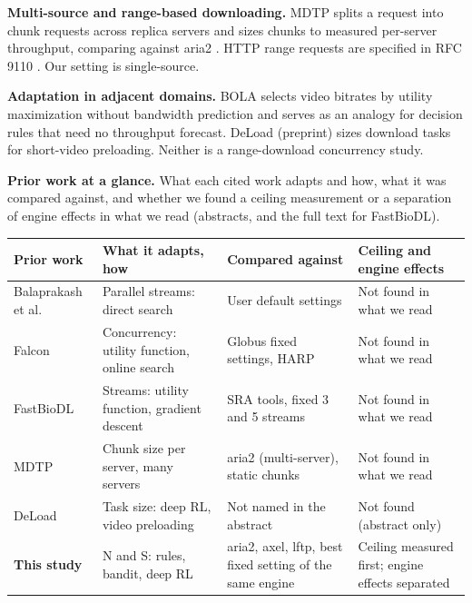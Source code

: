 \documentclass[conference]{IEEEtran}
\begin{document}
\textbf{Multi-source and range-based downloading.} MDTP \cite{abdollah2025mdtp} splits a request into chunk requests across replica servers and sizes chunks to measured per-server throughput, comparing against aria2 \cite{aria2manual}. HTTP range requests are specified in RFC 9110 \cite{rfc9110}. Our setting is single-source.


\textbf{Adaptation in adjacent domains.} BOLA \cite{spiteri2016bola,spiteri2020bola} selects video bitrates by utility maximization without bandwidth prediction and serves as an analogy for decision rules that need no throughput forecast. DeLoad \cite{liu2025deload} (preprint) sizes download tasks for short-video preloading. Neither is a range-download concurrency study.


\textbf{Prior work at a glance.} What each cited work adapts and how, what it was compared against, and whether we found a ceiling measurement or a separation of engine effects in what we read (abstracts, and the full text for FastBioDL).


\begin{table}[!t]\centering\footnotesize
\begin{tabularx}{\textwidth}{@{}LLLL@{}}
\toprule
\textbf{Prior work} & \textbf{What it adapts, how} & \textbf{Compared against} & \textbf{Ceiling and engine effects}\\
\midrule
Balaprakash et al. \cite{balaprakash2016direct} & Parallel streams: direct search & User default settings & Not found in what we read\\
Falcon \cite{arifuzzaman2021online,arifuzzaman2023falcon} & Concurrency: utility function, online search & Globus fixed settings, HARP & Not found in what we read\\
FastBioDL \cite{swargo2025fastbiodl} & Streams: utility function, gradient descent & SRA tools, fixed 3 and 5 streams & Not found in what we read\\
MDTP \cite{abdollah2025mdtp} & Chunk size per server, many servers & aria2 (multi-server), static chunks & Not found in what we read\\
DeLoad \cite{liu2025deload} & Task size: deep RL, video preloading & Not named in the abstract & Not found (abstract only)\\
\textbf{This study} & N and S: rules, bandit, deep RL & aria2, axel, lftp, best fixed setting of the same engine & Ceiling measured first; engine effects separated\\
\bottomrule
\end{tabularx}
\end{table}
\end{document}
